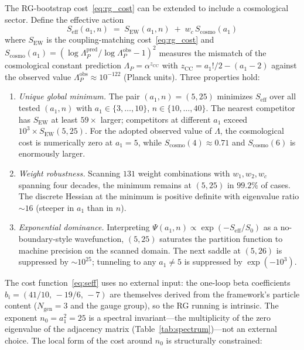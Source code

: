 \documentclass[12pt,a4paper]{article}
\theoremstyle{definition}
\begin{document}
The RG-bootstrap cost~\eqref{eq:rg_cost} can be extended to include a cosmological sector.  Define the effective action
\begin{equation}
S_{\mathrm{eff}}(a_1, n) \;=\; S_{\mathrm{EW}}(a_1, n) \;+\; w_c\, S_{\mathrm{cosmo}}(a_1)
\label{eq:seff}
\end{equation}
where $S_{\mathrm{EW}}$ is the coupling-matching cost~\eqref{eq:rg_cost} and $S_{\mathrm{cosmo}}(a_1) = (\log\Lambda_P^{\mathrm{pred}} / \log\Lambda_P^{\mathrm{obs}} - 1)^2$ measures the mismatch of the cosmological constant prediction $\Lambda_P = \alpha^{z_{\mathrm{CC}}}$ with $z_{\mathrm{CC}} = a_1!/2 - (a_1-2)$ against the observed value $\Lambda_P^{\mathrm{obs}} \approx 10^{-122}$ (Planck units).  Three properties hold:
\begin{enumerate}
\item[(i)] \emph{Unique global minimum.}  The pair $(a_1, n) = (5, 25)$ minimizes $S_{\mathrm{eff}}$ over all tested $(a_1, n)$ with $a_1 \in \{3, \ldots, 10\}$, $n \in \{10, \ldots, 40\}$.  The nearest competitor has $S_{\mathrm{EW}}$ at least $59\times$ larger; competitors at different $a_1$ exceed $10^3 \times S_{\mathrm{EW}}(5,25)$.  For the adopted observed value of $\Lambda$, the cosmological cost is numerically zero at $a_1=5$, while $S_{\mathrm{cosmo}}(4) \approx 0.71$ and $S_{\mathrm{cosmo}}(6)$ is enormously larger.
\item[(ii)] \emph{Weight robustness.}  Scanning $131$ weight combinations with $w_1, w_2, w_c$ spanning four decades, the minimum remains at $(5, 25)$ in $99.2\%$ of cases.  The discrete Hessian at the minimum is positive definite with eigenvalue ratio $\sim\!16$ (steeper in $a_1$ than in $n$).
\item[(iii)] \emph{Exponential dominance.}  Interpreting $\Psi(a_1,n) \propto \exp(-S_{\mathrm{eff}}/S_0)$ as a no-boundary-style wavefunction, $(5,25)$ saturates the partition function to machine precision on the scanned domain.  The next saddle at $(5,26)$ is suppressed by $\sim 10^{25}$; tunneling to any $a_1 \neq 5$ is suppressed by $\exp(-10^3)$.
\end{enumerate}
The cost function~\eqref{eq:seff} uses no external input: the one-loop beta coefficients $b_i = (41/10,\,-19/6,\,-7)$ are themselves derived from the framework's particle content ($N_{\text{gen}} = 3$ and the gauge group), so the RG running is intrinsic.  The exponent $n_0 = a_1^2 = 25$ is a spectral invariant---the multiplicity of the zero eigenvalue of the adjacency matrix (Table~\ref{tab:spectrum})---not an external choice.  The local form of the cost around $n_0$ is structurally constrained:
\end{document}
